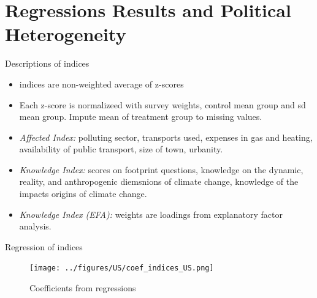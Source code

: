 \documentclass[aspectratio=169,9pt,dvipsnames]{beamer}
\begin{document}
\section{Regressions Results and Political Heterogeneity}

\begin{frame}{Descriptions of indices}
\begin{itemize}
  \item indices are non-weighted average of z-scores
  \item Each z-score is normalizeed with survey weights, control mean group and sd mean group. Impute mean of treatment group to missing values.
  \item \textit{Affected Index:} polluting sector, transports used, expenses in gas and heating, availability of public transport, size of town, urbanity.
  \item \textit{Knowledge Index:} scores on footprint questions, knowledge on the dynamic, reality, and anthropogenic diemsnions of climate change, knowledge of the impacts origins of climate change.
  \item \textit{Knowledge Index (EFA):} weights are loadings from explanatory factor analysis.
\end{itemize}
\end{frame}

\begin{frame}{}%
\begin{table}[h!]
\caption{indices}
\begin{center}
\scalebox{.33}{}
\end{center}
\end{table}
\end{frame}

\begin{frame}{}%
\begin{table}[h!]
\caption{Support with indices}
\begin{center}
\scalebox{.28}{}
\end{center}
\end{table}
\end{frame}

\begin{frame}{Regression of indices}%
\vspace{-.5cm}
\begin{figure}[h!]
\caption{Coefficients from regressions}
\texttt{[image: ../figures/US/coef\_indices\_US.png]} \\
\end{figure}
\end{frame}
\end{document}
